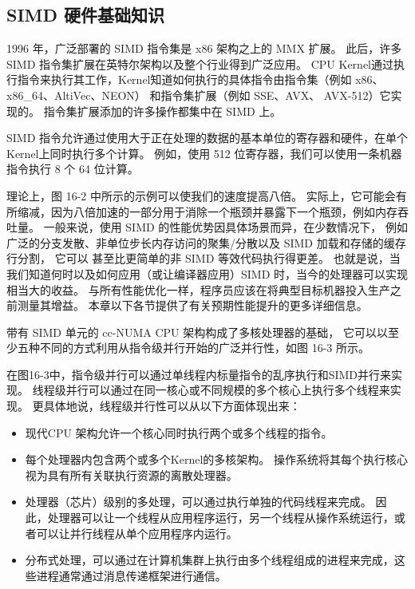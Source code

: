 \subsection{SIMD 硬件基础知识}
1996 年，广泛部署的 SIMD 指令集是 x86 架构之上的 MMX 扩展。 
此后，许多 SIMD 指令集扩展在英特尔架构以及整个行业得到广泛应用。 
CPU Kernel通过执行指令来执行其工作，Kernel知道如何执行的具体指令由指令集（例如 x86、x86\_64、AltiVec、NEON）
和指令集扩展（例如 SSE、AVX、 AVX-512）它实现的。 指令集扩展添加的许多操作都集中在 SIMD 上。

SIMD 指令允许通过使用大于正在处理的数据的基本单位的寄存器和硬件，在单个Kernel上同时执行多个计算。 
例如，使用 512 位寄存器，我们可以使用一条机器指令执行 8 个 64 位计算。

理论上，图 16-2 中所示的示例可以使我们的速度提高八倍。 
实际上，它可能会有所缩减，因为八倍加速的一部分用于消除一个瓶颈并暴露下一个瓶颈，例如内存吞吐量。 
一般来说，使用 SIMD 的性能优势因具体场景而异，在少数情况下，
例如广泛的分支发散、非单位步长内存访问的聚集/分散以及 SIMD 加载和存储的缓存行分割，
它可以 甚至比更简单的非 SIMD 等效代码执行得更差。 
也就是说，当我们知道何时以及如何应用（或让编译器应用）SIMD 时，当今的处理器可以实现相当大的收益。 
与所有性能优化一样，程序员应该在将典型目标机器投入生产之前测量其增益。 
本章以下各节提供了有关预期性能提升的更多详细信息。

带有 SIMD 单元的 cc-NUMA CPU 架构构成了多核处理器的基础，
它可以以至少五种不同的方式利用从指令级并行开始的广泛并行性，如图 16-3 所示。

在图16-3中，指令级并行可以通过单线程内标量指令的乱序执行和SIMD并行来实现。 
线程级并行可以通过在同一核心或不同规模的多个核心上执行多个线程来实现。 
更具体地说，线程级并行性可以从以下方面体现出来：

\begin{itemize}
	\item 现代CPU 架构允许一个核心同时执行两个或多个线程的指令。

	\item 每个处理器内包含两个或多个Kernel的多核架构。 
	操作系统将其每个执行核心视为具有所有关联执行资源的离散处理器。

	\item 处理器（芯片）级别的多处理，可以通过执行单独的代码线程来完成。 
	因此，处理器可以让一个线程从应用程序运行，另一个线程从操作系统运行，或者可以让并行线程从单个应用程序内运行。

	\item 分布式处理，可以通过在计算机集群上执行由多个线程组成的进程来完成，这些进程通常通过消息传递框架进行通信。
\end{itemize}

